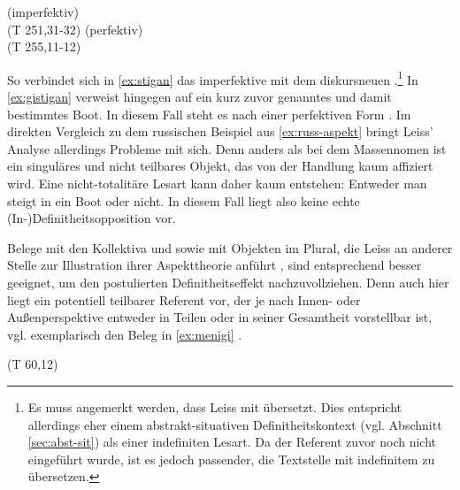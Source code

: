 \begin{exe}
	\ex \label{ex:gi-stigan}   
	\begin{xlist}
		\ex \label{ex:stigan}   (imperfektiv) \\ 
		 (T 251,31-32)
		\ex \label{ex:gistigan}   (perfektiv) \\   (T 255,11-12)
		\end{xlist}
\end{exe}
\noindent
So verbindet sich in \ref{ex:stigan} das imperfektive   mit dem diskursneuen .\footnote{Es muss angemerkt werden, dass Leiss  mit  übersetzt. Dies entspricht allerdings eher einem abstrakt-situativen Definitheitskontext (vgl. Abschnitt \ref{sec:abst-sit}) als einer indefiniten Lesart. Da der Referent zuvor noch nicht eingeführt wurde, ist es jedoch passender, die Textstelle mit indefinitem  zu übersetzen.} In \ref{ex:gistigan} verweist  hingegen auf ein kurz zuvor genanntes und damit bestimmtes Boot. In diesem Fall steht es nach einer perfektiven Form .
Im direkten Vergleich zu dem russischen Beispiel aus \ref{ex:russ-aspekt} bringt Leiss' Analyse allerdings Probleme mit sich. Denn anders als bei dem Massennomen  ist  ein singuläres und nicht teilbares Objekt, das von der Handlung  kaum affiziert wird. Eine nicht-totalitäre Lesart kann daher kaum entstehen: Entweder man steigt in ein Boot oder nicht. In diesem Fall liegt also keine echte (In-)Definitheitsopposition vor. 

Belege mit den Kollektiva   und   sowie mit Objekten im Plural, die Leiss an anderer Stelle zur Illustration ihrer Aspekttheorie anführt \parencite[170ff.]{Leiss2000}, sind entsprechend besser geeignet, um den postulierten Definitheitseffekt nachzuvollziehen. Denn auch hier liegt ein potentiell teilbarer Referent vor, der je nach Innen- oder Außenperspektive entweder in Teilen oder in seiner Gesamtheit vorstellbar ist, vgl. exemplarisch den Beleg in \ref{ex:menigi} \parencite[170]{Leiss2000}. 


\begin{exe}
	\ex \label{ex:menigi}   (T 60,12)\\ 	
\end{exe}

